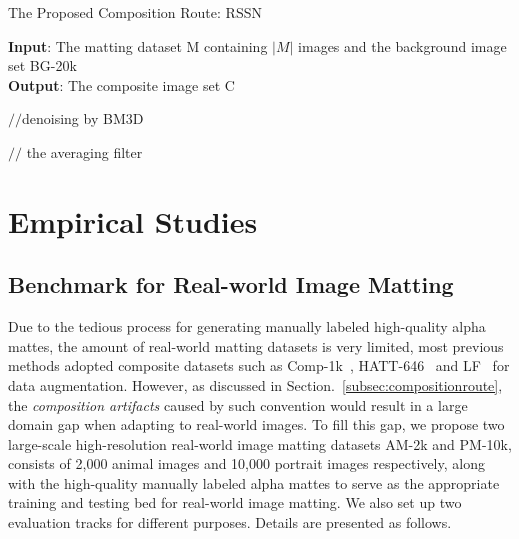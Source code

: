 \documentclass[twocolumn]{svjour3}
\begin{document}
\begin{algorithm}
\caption{The Proposed Composition Route: RSSN} 
\label{alg:pipeline}
\textbf{Input}: The matting dataset M containing $|M|$ images and
the background image set BG-20k  \\
\textbf{Output}: The composite image set C
\begin{algorithmic}[1]

\ELSE 
{} 
\ENDIF 


 $//$denoising by BM3D \citep{dabov2009bm3d}
\ENDIF 

 $//$ the averaging filter
\ENDIF 



\ENDIF 
\ENDFOR
\ENDFOR
\end{algorithmic}
\end{algorithm}


\section{Empirical Studies}
\label{sec:experiments}

\subsection{Benchmark for Real-world Image Matting}
\label{sec:dataset}
Due to the tedious process for generating manually labeled high-quality alpha mattes, the amount of real-world matting datasets is very limited, most previous methods adopted composite datasets such as Comp-1k~\citep{xu2017deep}, HATT-646~\citep{Qiao_2020_CVPR} and LF~\citep{zhang2019late} for data augmentation. However, as discussed in Section.~\ref{subsec:compositionroute}, the \emph{composition artifacts} caused by such convention would result in a large domain gap when adapting to real-world images. To fill this gap, we propose two large-scale high-resolution real-world image matting datasets AM-2k and PM-10k, consists of 2,000 animal images and 10,000 portrait images respectively, along with the high-quality manually labeled alpha mattes to serve as the appropriate training and testing bed for real-world image matting. We also set up two evaluation tracks for different purposes. Details are presented as follows.
\end{document}
